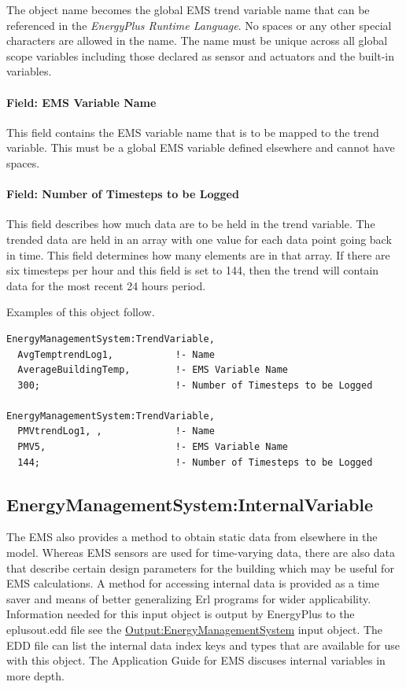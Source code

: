 The object name becomes the global EMS trend variable name that can be referenced in the \emph{EnergyPlus Runtime Language}. No spaces or any other special characters are allowed in the name. The name must be unique across all global scope variables including those declared as sensor and actuators and the built-in variables.

\paragraph{Field: EMS Variable Name}\label{field-ems-variable-name-2}

This field contains the EMS variable name that is to be mapped to the trend variable. This must be a global EMS variable defined elsewhere and cannot have spaces.

\paragraph{Field: Number of Timesteps to be Logged}\label{field-number-of-timesteps-to-be-logged}

This field describes how much data are to be held in the trend variable. The trended data are held in an array with one value for each data point going back in time. This field determines how many elements are in that array. If there are six timesteps per hour and this field is set to 144, then the trend will contain data for the most recent 24 hours period.

Examples of this object follow.

\begin{lstlisting}
EnergyManagementSystem:TrendVariable,
  AvgTemptrendLog1,           !- Name
  AverageBuildingTemp,        !- EMS Variable Name
  300;                        !- Number of Timesteps to be Logged

EnergyManagementSystem:TrendVariable,
  PMVtrendLog1, ,             !- Name
  PMV5,                       !- EMS Variable Name
  144;                        !- Number of Timesteps to be Logged
\end{lstlisting}

\subsection{EnergyManagementSystem:InternalVariable}\label{energymanagementsysteminternalvariable}

The EMS also provides a method to obtain static data from elsewhere in the model. Whereas EMS sensors are used for time-varying data, there are also data that describe certain design parameters for the building which may be useful for EMS calculations. A method for accessing internal data is provided as a time saver and means of better generalizing Erl programs for wider applicability. Information needed for this input object is output by EnergyPlus to the eplusout.edd file see the \hyperref[outputenergymanagementsystem]{Output:EnergyManagementSystem} input object. The EDD file can list the internal data index keys and types that are available for use with this object. The Application Guide for EMS discuses internal variables in more depth.

